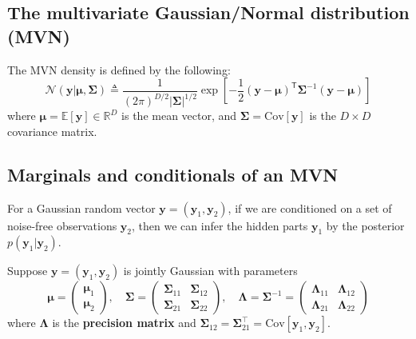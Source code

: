 \documentclass[11pt]{article}
\begin{document}
\subsection{The multivariate Gaussian/Normal distribution (MVN)}
The MVN density is defined by the following:
\[
\mathcal{N}(\boldsymbol{y} | \boldsymbol{\mu}, \boldsymbol{\Sigma}) \triangleq \frac{1}{(2\pi)^{D/2} |\boldsymbol{\Sigma}|^{1/2}} \exp \left[ -\frac{1}{2} (\boldsymbol{y} - \boldsymbol{\mu})^\mathsf{T} \boldsymbol{\Sigma}^{-1} (\boldsymbol{y} - \boldsymbol{\mu}) \right]
\]
where $\boldsymbol{\mu} = \mathbb{E}[\boldsymbol{y}] \in \mathbb{R}^D$ is the mean vector, and $\boldsymbol{\Sigma} = \text{Cov}[\boldsymbol{y}]$ is the $D \times D$ covariance matrix.

\subsection{Marginals and conditionals of an MVN}
For a Gaussian random vector $\boldsymbol{y} = (\boldsymbol{y}_1, \boldsymbol{y}_2)$,
if we are conditioned on a set of noise-free observations $\boldsymbol{y}_2$, then we can infer the hidden parts $\boldsymbol{y}_1$ by the posterior $p(\boldsymbol{y}_1 | \boldsymbol{y}_2)$.

Suppose $\boldsymbol{y} = (\boldsymbol{y}_1, \boldsymbol{y}_2)$ is jointly Gaussian with parameters
\[
\boldsymbol{\mu} = \begin{pmatrix} \boldsymbol{\mu}_1 \\ \boldsymbol{\mu}_2 \end{pmatrix}, \quad
\boldsymbol{\Sigma} = \begin{pmatrix} \boldsymbol{\Sigma}_{11} & \boldsymbol{\Sigma}_{12} \\ \boldsymbol{\Sigma}_{21} & \boldsymbol{\Sigma}_{22} \end{pmatrix}, \quad
\boldsymbol{\Lambda} = \boldsymbol{\Sigma}^{-1} = \begin{pmatrix} \boldsymbol{\Lambda}_{11} & \boldsymbol{\Lambda}_{12} \\ \boldsymbol{\Lambda}_{21} & \boldsymbol{\Lambda}_{22} \end{pmatrix}
\]
where $\boldsymbol{\Lambda}$ is the \textbf{precision matrix} and $\boldsymbol{\Sigma}_{12} = \boldsymbol{\Sigma}_{21}^\top = \text{Cov}[\boldsymbol{y}_1, \boldsymbol{y}_2]$. 
\end{document}
